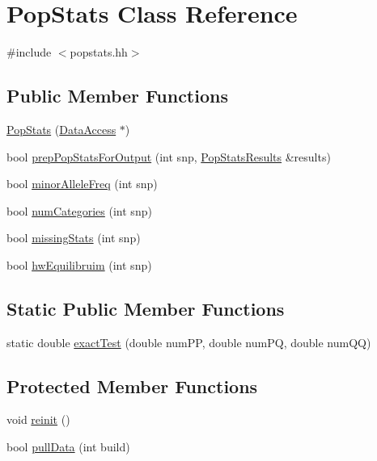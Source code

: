 \hypertarget{classPopStats}{
\section{PopStats Class Reference}
\label{classPopStats}
}


{\ttfamily \#include $<$popstats.hh$>$}

\subsection*{Public Member Functions}
\begin{DoxyCompactItemize}
\item 
\hyperlink{classPopStats_a4ffd944436becd97e62cc17c7571f5b1}{PopStats} (\hyperlink{classDataAccess}{DataAccess} $\ast$)
\item 
bool \hyperlink{classPopStats_a9e1f510002cc848f241ce4c2984ccfd1}{prepPopStatsForOutput} (int snp, \hyperlink{structPopStatsResults}{PopStatsResults} \&results)
\item 
bool \hyperlink{classPopStats_a4978bba774ba8083ae8c145ab2754645}{minorAlleleFreq} (int snp)
\item 
bool \hyperlink{classPopStats_a41ed10737d6c1180b1f70ecd93576256}{numCategories} (int snp)
\item 
bool \hyperlink{classPopStats_a6dd383cd1ae923ca78c6f6f38ea76ae8}{missingStats} (int snp)
\item 
bool \hyperlink{classPopStats_ad1cf6860b6145938aeb53567941121a1}{hwEquilibruim} (int snp)
\end{DoxyCompactItemize}
\subsection*{Static Public Member Functions}
\begin{DoxyCompactItemize}
\item 
static double \hyperlink{classPopStats_ad40f3901d6684bed72e1fb359dbd8ab0}{exactTest} (double numPP, double numPQ, double numQQ)
\end{DoxyCompactItemize}
\subsection*{Protected Member Functions}
\begin{DoxyCompactItemize}
\item 
void \hyperlink{classPopStats_ab4fb5cd7b7b44529e91fcd6bb6abb7d4}{reinit} ()
\item 
bool \hyperlink{classPopStats_aa2ceb900a4674a55faf006776c7a7776}{pullData} (int build)
\end{DoxyCompactItemize}
